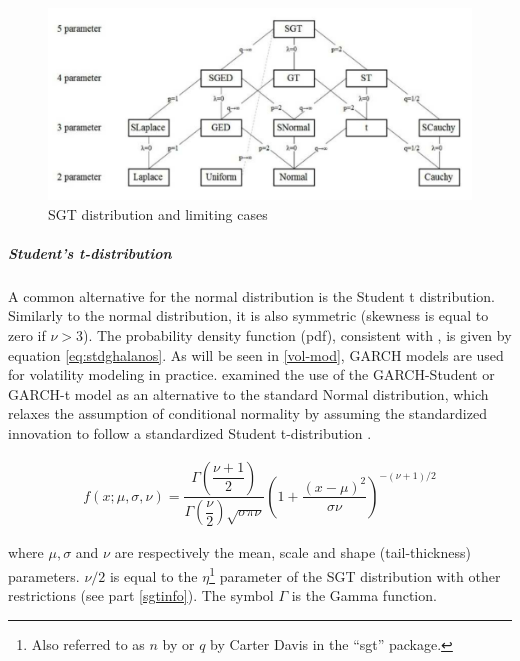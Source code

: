 \documentclass[a4paper, twoside]{templates/ociamthesis}
\begin{document}
\begin{figure}

{\centering \includegraphics[width=1\linewidth]{front-and-back-matter/images/SGT} 

}

\caption{SGT distribution and limiting cases}\label{fig:figure}
\end{figure}

\hypertarget{students-t-distribution}{%
\subparagraph{Student's t-distribution}\label{students-t-distribution}}

\noindent A common alternative for the normal distribution is the Student t distribution. Similarly to the normal distribution, it is also symmetric (skewness is equal to zero if \(\nu > 3\)). The probability density function (pdf), consistent with \textcite{ghalanos2020}, is given by equation \eqref{eq:stdghalanos}. As will be seen in \ref{vol-mod}, GARCH models are used for volatility modeling in practice. \textcite{bollerslev1987} examined the use of the GARCH-Student or GARCH-t model as an alternative to the standard Normal distribution, which relaxes the assumption of conditional normality by assuming the standardized innovation to follow a standardized Student t-distribution \autocite{bollerslev2008}.

\begin{align}
f(x; \mu, \sigma,\nu) = \dfrac{\Gamma(\dfrac{\nu+1}{2})}{\Gamma(\dfrac{\nu}{2})\sqrt{\sigma \pi \nu}} \left(1+\dfrac{(x-\mu)^2}{\sigma \nu}\right)^{-(\nu+1)/2}
 \label{eq:stdghalanos}
\end{align}

\noindent where \(\mu, \sigma\) and \(\nu\) are respectively the mean, scale and shape (tail-thickness) parameters. \(\nu/2\) is equal to the \(\eta\)\footnote{Also referred to as \(n\) by \textcite{theodossiou1998} or \(q\) by Carter Davis in the ``sgt'' package.} parameter of the SGT distribution with other restrictions (see part \ref{sgtinfo}). The symbol \(\Gamma\) is the Gamma function.
\end{document}
